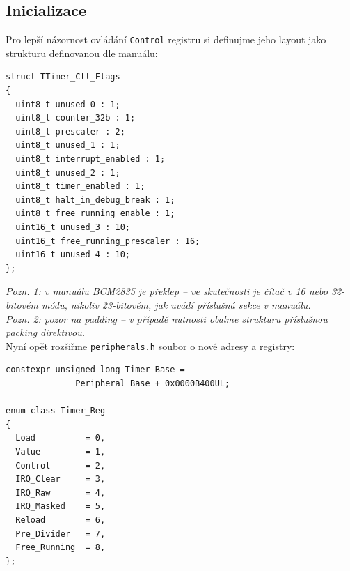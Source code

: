 \documentclass{article}
\begin{document}
\subsection{Inicializace}

Pro lepší názornost ovládání \texttt{Control} registru si definujme jeho layout jako strukturu definovanou dle manuálu:
\begin{lstlisting}
struct TTimer_Ctl_Flags
{
  uint8_t unused_0 : 1;
  uint8_t counter_32b : 1;
  uint8_t prescaler : 2;
  uint8_t unused_1 : 1;
  uint8_t interrupt_enabled : 1;
  uint8_t unused_2 : 1;
  uint8_t timer_enabled : 1;
  uint8_t halt_in_debug_break : 1;
  uint8_t free_running_enable : 1;
  uint16_t unused_3 : 10;
  uint16_t free_running_prescaler : 16;
  uint16_t unused_4 : 10;
};
\end{lstlisting}
\emph{Pozn. 1: v manuálu BCM2835 je překlep -- ve skutečnosti je čítač v 16 nebo 32-bitovém módu, nikoliv 23-bitovém, jak uvádí příslušná sekce v manuálu.}\\
\emph{Pozn. 2: pozor na padding -- v případě nutnosti obalme strukturu příslušnou packing direktivou.}
\\

Nyní opět rozšiřme \texttt{peripherals.h} soubor o nové adresy a registry:
\begin{lstlisting}
constexpr unsigned long Timer_Base =
              Peripheral_Base + 0x0000B400UL;

enum class Timer_Reg
{
  Load          = 0,
  Value         = 1,
  Control       = 2,
  IRQ_Clear     = 3,
  IRQ_Raw       = 4,
  IRQ_Masked    = 5,
  Reload        = 6,
  Pre_Divider   = 7,
  Free_Running  = 8,
};
\end{lstlisting}
\end{document}
